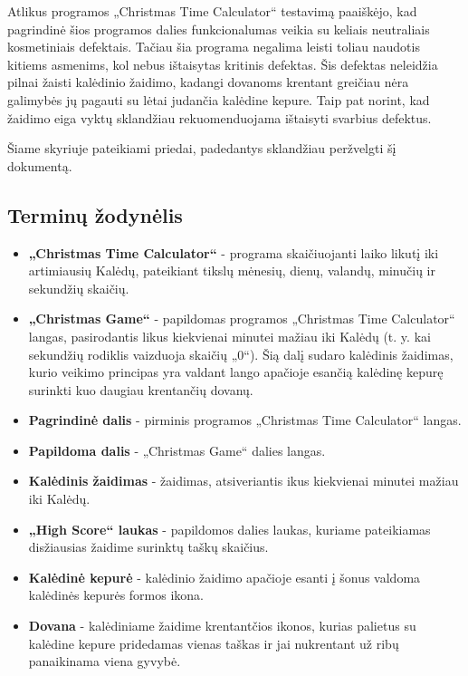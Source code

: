 \documentclass{VUMIFPSkursinis}
\begin{document}
			Atlikus programos „Christmas Time Calculator“ testavimą paaiškėjo, kad pagrindinė šios programos dalies funkcionalumas 
			veikia su keliais neutraliais kosmetiniais defektais. Tačiau šia programa negalima leisti toliau naudotis kitiems asmenims,
			kol nebus ištaisytas kritinis defektas. Šis defektas neleidžia pilnai žaisti kalėdinio žaidimo, kadangi dovanoms krentant greičiau
			nėra galimybės jų pagauti su lėtai judančia kalėdine kepure. Taip pat norint, kad žaidimo eiga vyktų sklandžiau rekuomenduojama
			ištaisyti svarbius defektus.
	
	 \label{priedai}
		Šiame skyriuje pateikiami priedai, padedantys sklandžiau peržvelgti šį dokumentą.
		\subsection*{Terminų žodynėlis} \label{zodynas}
			\begin{itemize}
				\item \textbf{„Christmas Time Calculator“} - programa skaičiuojanti laiko likutį iki artimiausių Kalėdų, 
				pateikiant tikslų mėnesių, dienų, valandų, minučių ir sekundžių skaičių.
				\item \textbf{„Christmas Game“} - papildomas programos „Christmas Time Calculator“ langas, pasirodantis likus kiekvienai
				minutei mažiau iki Kalėdų (t. y. kai sekundžių rodiklis vaizduoja skaičių „0“). Šią dalį sudaro kalėdinis žaidimas,
				kurio veikimo principas yra valdant lango apačioje esančią kalėdinę kepurę surinkti kuo daugiau krentančių dovanų.
				\item \textbf{Pagrindinė dalis} - pirminis programos „Christmas Time Calculator“ langas.
				\item \textbf{Papildoma dalis} - „Christmas Game“ dalies langas.
				\item \textbf{Kalėdinis žaidimas} - žaidimas, atsiveriantis ikus kiekvienai minutei mažiau iki Kalėdų.
				\item \textbf{„High Score“ laukas} - papildomos dalies laukas, kuriame pateikiamas disžiausias žaidime surinktų taškų skaičius.
				\item \textbf{Kalėdinė kepurė} - kalėdinio žaidimo apačioje esanti į šonus valdoma kalėdinės kepurės formos ikona.
				\item \textbf{Dovana} - kalėdiniame žaidime krentantčios ikonos, kurias palietus su kalėdine kepure pridedamas vienas taškas
				ir jai nukrentant už ribų panaikinama viena gyvybė. 
			\end{itemize}
\end{document}
